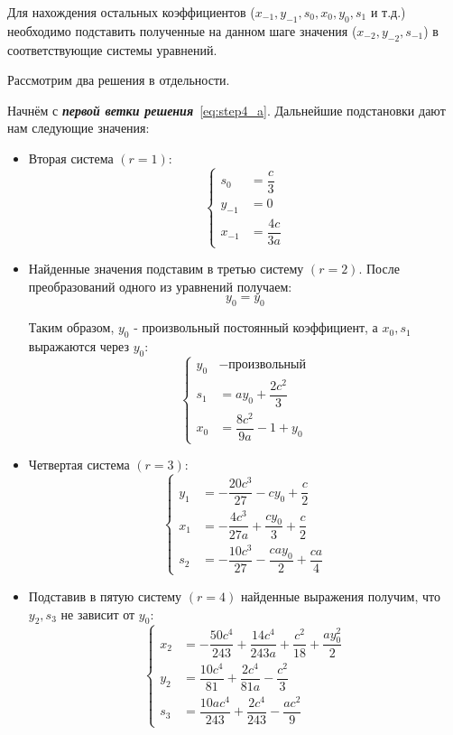 Для нахождения остальных коэффициентов ($ x_{-1}, y_{-1}, s_{0},
x_{0}, y_{0}, s_{1} $ и т.д.) необходимо подставить полученные на
данном шаге значения ($ x_{-2}, y_{-2}, s_{-1} $) в соответствующие
системы уравнений.

Рассмотрим два решения в отдельности.

\clearpage

Начнём с \textit{\textbf{первой ветки решения}}~\ref{eq:step4_a}. Дальнейшие подстановки дают нам следующие значения:
\begin{itemize}
\item Вторая система $ (r = 1) $:
\begin{equation*}
\left\{
	\begin{aligned}
		s_{0} &= \dfrac{c}{3} \\
		y_{-1} &= 0 \\
		x_{-1} &= \dfrac{4c}{3a}
	\end{aligned}
\right.
\end{equation*}

\item Найденные значения подставим в третью систему $ (r = 2) $.
  После преобразований одного из уравнений получаем:
\begin{equation*} 
	y_0 = y_0
\end{equation*} 

Таким образом, $ y_0 $ - произвольный постоянный коэффициент, а $ x_0, s_1 $ выражаются через $ y_0 $:
\begin{equation*}
\left\{
	\begin{aligned}
		y_{0} &- \text{произвольный} \\
		s_{1} &= ay_0 + \dfrac{2c^2}{3} \\
		x_{0} &= \dfrac{8c^2}{9a} - 1 + y_0
	\end{aligned}
\right.
\end{equation*}

\item Четвертая система $ (r = 3) $:
\begin{equation*}
\left\{
	\begin{aligned}
		y_1 &= -\dfrac{20c^3}{27} - cy_0 + \dfrac{c}{2} \\
		x_1 &= -\dfrac{4c^3}{27a} + \dfrac{cy_0}{3} + \dfrac{c}{2} \\
		s_2 &= -\dfrac{10c^3}{27} - \dfrac{cay_0}{2} + \dfrac{ca}{4}
	\end{aligned}
\right.
\end{equation*}

\item Подставив в пятую систему $ (r = 4) $ найденные выражения получим, что $ y_2,s_3 $ не зависит от $ y_0 $:
\begin{equation*}
\left\{
	\begin{aligned}
		x_2 &= -\dfrac{50c^4}{243} + \dfrac{14c^4}{243a} + \dfrac{c^2}{18} + \dfrac{ay^2_0}{2}\\
		y_2 &= \dfrac{10c^4}{81} + \dfrac{2c^4}{81a} - \dfrac{c^2}{3} \\
		s_3 &= \dfrac{10ac^4}{243} + \dfrac{2c^4}{243} - \dfrac{ac^2}{9}
	\end{aligned}
\right.
\end{equation*}


\end{itemize}
